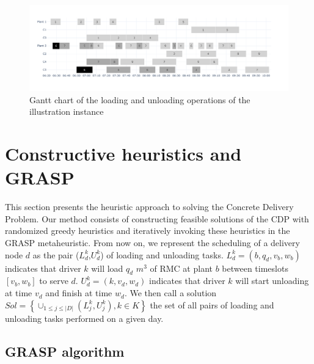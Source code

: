 \documentclass{article}
\begin{document}
\begin{figure}[htb]
    \centering
    \caption{Gantt chart of the loading and unloading operations of the illustration instance}
    \label{fig:plants_schedules}
        \includegraphics[width=\linewidth]{exemple.pdf}
\end{figure}

\section{Constructive heuristics and GRASP}
\label{sec:cdp_grasp_method}

This section presents the heuristic approach to solving the Concrete Delivery Problem. Our method consists of constructing feasible solutions of the CDP with randomized greedy heuristics and iteratively invoking these heuristics in the GRASP metaheuristic. From now on, we represent the scheduling of a delivery node $d$ as the pair ($L^k_{d}$,$U^k_{d}$) of loading and unloading tasks. $L^k_{d} = \left(b,q_d,v_b,w_b\right)$ indicates that driver $k$ will load $q_d$ $m^3$ of RMC at plant $b$ between timeslots $\left[v_b,w_b\right]$ to serve $d$. $U^k_{d} = \left(k,v_d, w_d\right)$ indicates that driver $k$ will start unloading at time $v_d$ and finish at time $w_d$. We then call a solution $Sol =\left\lbrace \cup _{1 \leq j \leq |D|} (L^k_{j}, U^k_{j}), k \in K \right\rbrace$ the set of all pairs of loading and unloading tasks performed on a given day.

\subsection{GRASP algorithm}
\end{document}
